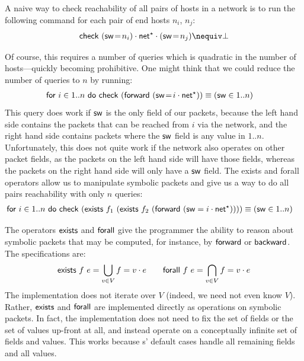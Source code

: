 \documentclass[acmsmall,dvipsnames,nonacm]{acmart}
\begin{document}
\begin{example}\label{ex:linear-reachability}
A naive way to check reachability of all pairs of hosts in a network is to run
the following command for each pair of end hosts $n_i$, $n_j$:
\[ \NKcheck\ (\sw \test n_i) \cdot \textsf{net}^\star \cdot (\sw \test n_j) \nequiv \bot \]

Of course, this requires a number of queries which is quadratic in the number of
hosts---quickly becoming prohibitive. One might think that we could reduce the number of queries to $n$ by running:
\begin{align*}
    &\textsf{for}\ i \in 1..n\ \textsf{do}\ \textsf{check}\ (\textsf{forward}\ (\mathsf{sw} \mathrel{\!=\!} i \cdot \textsf{net}^\star)) \equiv (\mathsf{sw} \in 1..n)
\end{align*}
This query does work if $\mathsf{sw}$ is the only field of our packets, because the left hand side contains the packets that can be reached from $i$ via the network, and the right hand side contains packets where the $\mathsf{sw}$ field is any value in $1..n$.
Unfortunately, this does not quite work if the network also operates on other packet fields, as the packets on the left hand side will have those fields, whereas the packets on the right hand side will only have a $\mathsf{sw}$ field.
The exists and forall operators allow us to manipulate symbolic packets and give us a way to do all pairs reachability with only $n$ queries:
\begin{align*}
    &\textsf{for}\ i \in 1..n\ \textsf{do}\ \textsf{check}\ (\textsf{exists}\ f_1\ (\textsf{exists}\ f_2\
    (\textsf{forward}\ (\mathsf{sw}=i \cdot \textsf{net}^\star)))) \equiv (\mathsf{sw} \in 1..n)
\end{align*}

The operators $\textsf{exists}$ and $\textsf{forall}$ give the programmer the ability to
reason about symbolic packets that may be computed, for instance, by $\textsf{forward}$ or
$\textsf{backward}$. The specifications are:
\begin{align*}
    \textsf{exists}\ f\ e = \bigcup_{v\in V} f=v \cdot e \qquad
    \textsf{forall}\ f\ e = \bigcap_{v\in V} f=v \cdot e
\end{align*}
The implementation does not iterate over $V$ (indeed, we need not even
know $V$). Rather, $\textsf{exists}$ and $\textsf{forall}$ are implemented directly as operations on symbolic packets.
In fact, the implementation does not need to fix the set of fields or the set of values up-front at all, and instead operate on a conceptually infinite set of fields and values.
This works because \SPPn{}s' default cases handle all remaining fields and all values.
\end{example}
\end{document}
